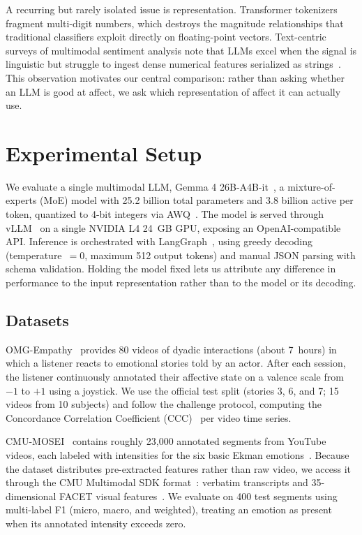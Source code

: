 \documentclass[conference]{IEEEtran}
\begin{document}
A recurring but rarely isolated issue is representation. Transformer tokenizers fragment multi-digit numbers, which destroys the magnitude relationships that traditional classifiers exploit directly on floating-point vectors. Text-centric surveys of multimodal sentiment analysis note that LLMs excel when the signal is linguistic but struggle to ingest dense numerical features serialized as strings~\cite{Survey2024TextCentric, Survey2025MLLMEmotion}. This observation motivates our central comparison: rather than asking whether an LLM is good at affect, we ask which representation of affect it can actually use.

\section{Experimental Setup}
\label{sec:method}
We evaluate a single multimodal LLM, Gemma 4 26B-A4B-it~\cite{Gemma3Team2025, Gemma4Card2026}, a mixture-of-experts (MoE) model with 25.2 billion total parameters and 3.8 billion active per token, quantized to 4-bit integers via AWQ~\cite{Lin2024AWQ}. The model is served through vLLM~\cite{Kwon2023vLLM} on a single NVIDIA L4 24~GB GPU, exposing an OpenAI-compatible API. Inference is orchestrated with LangGraph~\cite{LangGraph2024}, using greedy decoding (temperature~$=0$, maximum 512 output tokens) and manual JSON parsing with schema validation. Holding the model fixed lets us attribute any difference in performance to the input representation rather than to the model or its decoding.

\subsection{Datasets}
OMG-Empathy~\cite{Barros2019OMGEmpathy} provides 80 videos of dyadic interactions (about 7~hours) in which a listener reacts to emotional stories told by an actor. After each session, the listener continuously annotated their affective state on a valence scale from $-1$ to $+1$ using a joystick. We use the official test split (stories 3, 6, and 7; 15 videos from 10 subjects) and follow the challenge protocol, computing the Concordance Correlation Coefficient (CCC)~\cite{Lin1989CCC} per video time series.

CMU-MOSEI~\cite{Zadeh2018MOSEI} contains roughly 23{,}000 annotated segments from YouTube videos, each labeled with intensities for the six basic Ekman emotions~\cite{Ekman1992BasicEmotions}. Because the dataset distributes pre-extracted features rather than raw video, we access it through the CMU Multimodal SDK format~\cite{Zadeh2018MultiAttention}: verbatim transcripts and 35-dimensional FACET visual features~\cite{FACET}. We evaluate on 400 test segments using multi-label F1 (micro, macro, and weighted), treating an emotion as present when its annotated intensity exceeds zero.
\end{document}
